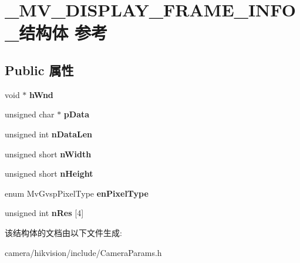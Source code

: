 \hypertarget{struct___m_v___d_i_s_p_l_a_y___f_r_a_m_e___i_n_f_o__}{}\section{\+\_\+\+M\+V\+\_\+\+D\+I\+S\+P\+L\+A\+Y\+\_\+\+F\+R\+A\+M\+E\+\_\+\+I\+N\+F\+O\+\_\+结构体 参考}
\label{struct___m_v___d_i_s_p_l_a_y___f_r_a_m_e___i_n_f_o__}
\subsection*{Public 属性}
\begin{DoxyCompactItemize}
\item 
\mbox{\label{struct___m_v___d_i_s_p_l_a_y___f_r_a_m_e___i_n_f_o___a6223b325b3ff0f8be9d51a4e09670030}} 
void $\ast$ {\bfseries h\+Wnd}
\item 
\mbox{\label{struct___m_v___d_i_s_p_l_a_y___f_r_a_m_e___i_n_f_o___ad030e3defdec3be4d6a1b06563931061}} 
unsigned char $\ast$ {\bfseries p\+Data}
\item 
\mbox{\label{struct___m_v___d_i_s_p_l_a_y___f_r_a_m_e___i_n_f_o___a704362d0ebe6d3635ccedf64f6e20a09}} 
unsigned int {\bfseries n\+Data\+Len}
\item 
\mbox{\label{struct___m_v___d_i_s_p_l_a_y___f_r_a_m_e___i_n_f_o___acdc9893664e857efd2e7abd1ac4c5ae5}} 
unsigned short {\bfseries n\+Width}
\item 
\mbox{\label{struct___m_v___d_i_s_p_l_a_y___f_r_a_m_e___i_n_f_o___a881be678265323edb499c1e1c7c764b5}} 
unsigned short {\bfseries n\+Height}
\item 
\mbox{\label{struct___m_v___d_i_s_p_l_a_y___f_r_a_m_e___i_n_f_o___a2246b622fb4cf55732bc5045254a6b48}} 
enum Mv\+Gvsp\+Pixel\+Type {\bfseries en\+Pixel\+Type}
\item 
\mbox{\label{struct___m_v___d_i_s_p_l_a_y___f_r_a_m_e___i_n_f_o___a95ba0c428a881eb86c7fe9fcffcde6ee}} 
unsigned int {\bfseries n\+Res} \mbox{[}4\mbox{]}
\end{DoxyCompactItemize}


该结构体的文档由以下文件生成\+:\begin{DoxyCompactItemize}
\item 
camera/hikvision/include/Camera\+Params.\+h\end{DoxyCompactItemize}
